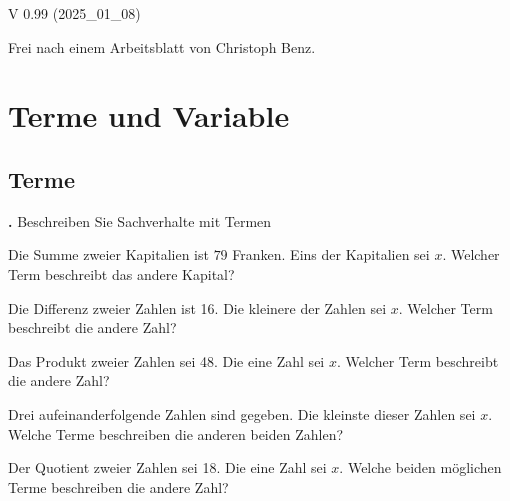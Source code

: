 
\renewcommand{\bbwAufgabenBlockID}{Gl1LinTxt}

\renewcommand{\metaHeaderLine}{Textaufgaben}
\renewcommand{\arbeitsblattTitel}{Textaufgaben zu linearen Gleichungen}


\arbeitsblattHeader{}

\begin{center}V 0.99 (2025\_01\_08) \end{center}

{\tiny{Frei nach einem Arbeitsblatt von Christoph Benz.}}


\section{Terme und Variable}



\subsection{Terme}

\textbf{\bbwAufgabenNummer{}.}
Beschreiben Sie Sachverhalte mit Termen


\begin{bbwAufgabenBlock}
\item Die Summe zweier Kapitalien ist $79$ Franken. Eins der
Kapitalien sei $x$. Welcher Term
beschreibt das andere Kapital?


\item Die Differenz zweier Zahlen ist 16. Die kleinere der Zahlen sei
$x$. Welcher Term beschreibt die andere Zahl?



\item Das Produkt zweier Zahlen sei 48. Die eine Zahl sei $x$. Welcher
Term beschreibt die andere Zahl?


\item Drei aufeinanderfolgende Zahlen sind gegeben. Die kleinste
dieser Zahlen sei $x$. Welche Terme beschreiben die anderen beiden
Zahlen?


\item Der Quotient zweier Zahlen sei 18. Die eine Zahl sei $x$. Welche
beiden möglichen Terme beschreiben die andere Zahl?


\end{bbwAufgabenBlock}

